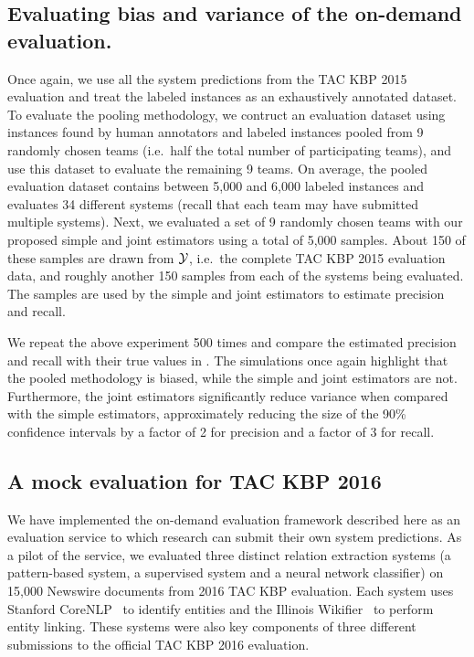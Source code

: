 \subsection{Evaluating bias and variance of the on-demand evaluation.}
Once again, we use all the system predictions from the TAC KBP 2015 evaluation and treat the labeled instances as an exhaustively annotated dataset.
To evaluate the pooling methodology, we contruct an evaluation dataset using
instances found by human annotators and labeled instances pooled from 9
randomly chosen teams (i.e.\ half the total number of participating teams), and
use this dataset to evaluate the remaining 9 teams.
On average, the pooled evaluation dataset contains between 5,000 and 6,000 labeled instances and evaluates 34 different systems (recall that each team may have submitted multiple systems).
Next, we evaluated a set of 9 randomly chosen teams with our proposed simple and joint estimators using a total of 5,000 samples.
About 150 of these samples are drawn from $\mathcal{Y}$, i.e.\ the complete TAC KBP 2015 evaluation data, and roughly another 150 samples from each of the systems being evaluated.
The samples are used by the simple and joint estimators to estimate precision and recall.

We repeat the above experiment 500 times and compare the estimated precision and recall with their true values in .
The simulations once again highlight that the pooled methodology is biased, while the simple and joint estimators are not.
Furthermore, the joint estimators significantly reduce variance when compared with the simple estimators,
approximately reducing the size of the 90\% confidence intervals by a factor of 2 for precision and a factor of 3 for recall.

\subsection{A mock evaluation for TAC KBP 2016}
We have implemented the on-demand evaluation framework described here as an evaluation service to which research can submit their own system predictions.
As a pilot of the service, we evaluated three distinct relation extraction systems (a pattern-based system, a supervised system and a neural network classifier) on 15,000 Newswire documents from 2016 TAC KBP evaluation.
Each system uses Stanford CoreNLP~\citep{manning2014stanford} to identify entities and the Illinois Wikifier~\citep{ratinov2011local} to perform entity linking. 
These systems were also key components of three different submissions to the official TAC KBP 2016 evaluation.

